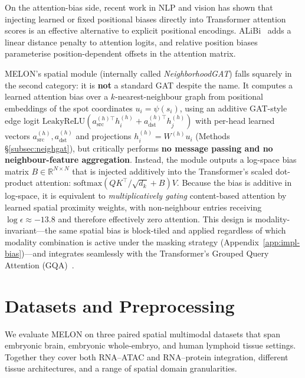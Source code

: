 \documentclass{article}
\theoremstyle{plain}
\theoremstyle{definition}
\begin{document}
On the attention-bias side, recent work in NLP and vision has shown that injecting learned or fixed positional biases directly into Transformer attention scores is an effective alternative to explicit positional encodings. ALiBi~\cite{press2022train} adds a linear distance penalty to attention logits, and relative position biases~\cite{raffel2020exploring,shaw2018self} parameterise position-dependent offsets in the attention matrix.

MELON's spatial module (internally called \emph{NeighborhoodGAT}) falls squarely in the second category: it is \textbf{not} a standard GAT despite the name. It computes a learned attention bias over a $k$-nearest-neighbour graph from positional embeddings of the spot coordinates $u_i = \psi(s_i)$, using an additive GAT-style edge logit $\mathrm{LeakyReLU}(a_{\mathrm{src}}^{(h)\top} h_i^{(h)} + a_{\mathrm{dst}}^{(h)\top} h_j^{(h)})$ with per-head learned vectors $a_{\mathrm{src}}^{(h)}, a_{\mathrm{dst}}^{(h)}$ and projections $h_i^{(h)} = W^{(h)} u_i$ (Methods \S\ref{subsec:neighgat}), but critically performs \textbf{no message passing and no neighbour-feature aggregation}. Instead, the module outputs a log-space bias matrix $B \in \mathbb{R}^{N \times N}$ that is injected additively into the Transformer's scaled dot-product attention: $\mathrm{softmax}(QK^\top/\sqrt{d_k} + B)V$. Because the bias is additive in log-space, it is equivalent to \emph{multiplicatively gating} content-based attention by learned spatial proximity weights, with non-neighbour entries receiving $\log\epsilon \approx -13.8$ and therefore effectively zero attention. This design is modality-invariant---the same spatial bias is block-tiled and applied regardless of which modality combination is active under the masking strategy (Appendix~\ref{app:impl-bias})---and integrates seamlessly with the Transformer's Grouped Query Attention (GQA)~\cite{ainslie2023gqa}.

\section{Datasets and Preprocessing}\label{app:datasets}

We evaluate MELON on three paired spatial multimodal datasets that span embryonic brain, embryonic whole-embryo, and human lymphoid tissue settings. Together they cover both RNA--ATAC and RNA--protein integration, different tissue architectures, and a range of spatial domain granularities.
\end{document}
